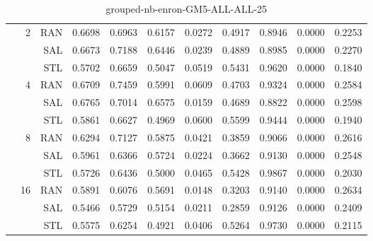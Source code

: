 \begin{center}
\begin{table}[htbp]
\begin{center}
\begin{tabular}{ | r | r | r | r | r | r | r | r | r | r | r |}
 & \multirow{3}{*}{2} & RAN & 0.6698 & 0.6963 & 0.6157 & 0.0272 & 0.4917 & 0.8946 & 0.0000 & 0.2253\\ \cline{3-11}
 &   & SAL & 0.6673 & 0.7188 & 0.6446 & 0.0239 & 0.4889 & 0.8985 & 0.0000 & 0.2270\\ \cline{3-11}
 &   & STL & 0.5702 & 0.6659 & 0.5047 & 0.0519 & 0.5431 & 0.9620 & 0.0000 & 0.1840\\ \cline{2-11}
 & \multirow{3}{*}{4} & RAN & 0.6709 & 0.7459 & 0.5991 & 0.0609 & 0.4703 & 0.9324 & 0.0000 & 0.2584\\ \cline{3-11}
 &   & SAL & 0.6765 & 0.7014 & 0.6575 & 0.0159 & 0.4689 & 0.8822 & 0.0000 & 0.2598\\ \cline{3-11}
 &   & STL & 0.5861 & 0.6627 & 0.4969 & 0.0600 & 0.5599 & 0.9444 & 0.0000 & 0.1940\\ \cline{2-11}
 & \multirow{3}{*}{8} & RAN & 0.6294 & 0.7127 & 0.5875 & 0.0421 & 0.3859 & 0.9066 & 0.0000 & 0.2616\\ \cline{3-11}
 &   & SAL & 0.5961 & 0.6366 & 0.5724 & 0.0224 & 0.3662 & 0.9130 & 0.0000 & 0.2548\\ \cline{3-11}
 &   & STL & 0.5726 & 0.6436 & 0.5000 & 0.0465 & 0.5428 & 0.9867 & 0.0000 & 0.2030\\ \cline{2-11}
 & \multirow{3}{*}{16} & RAN & 0.5891 & 0.6076 & 0.5691 & 0.0148 & 0.3203 & 0.9140 & 0.0000 & 0.2634\\ \cline{3-11}
 &   & SAL & 0.5466 & 0.5729 & 0.5154 & 0.0211 & 0.2859 & 0.9126 & 0.0000 & 0.2409\\ \cline{3-11}
 &   & STL & 0.5575 & 0.6254 & 0.4921 & 0.0406 & 0.5264 & 0.9730 & 0.0000 & 0.2115\\ \cline{2-11}
\hline
\end{tabular}
\caption{grouped-nb-enron-GM5-ALL-ALL-25}
\end{center}
 \end{table}
\end{center}

